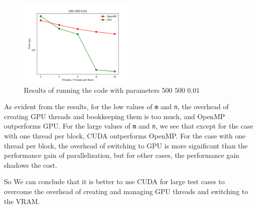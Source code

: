 \documentclass[12pt]{article}
\begin{document}
\begin{figure}[H]
	\centering
	\includegraphics[width=0.5\textwidth]{./images/Q5/500500001.png}	
	\cprotect\caption{Results of running the code with parameters $500$ $500$ $0.01$}
	\label{fig:5-6}
\end{figure}

As evident from the results, for the low values of \Verb+m+ and \Verb+n+, the overhead of creating GPU threads and bookkeeping them is too much, and OpenMP outperforms GPU. For the large values of \Verb+m+ and \Verb+n+, we see that except for the case with one thread per block, CUDA outperforms OpenMP. For the case with one thread per block, the overhead of switching to GPU is more significant than the performance gain of parallelization, but for other cases, the performance gain shadows the cost.

So We can conclude that it is better to use CUDA for large test cases to overcome the overhead of creating and managing GPU threads and switching to the VRAM. 



	
	
	
	
\end{document}
